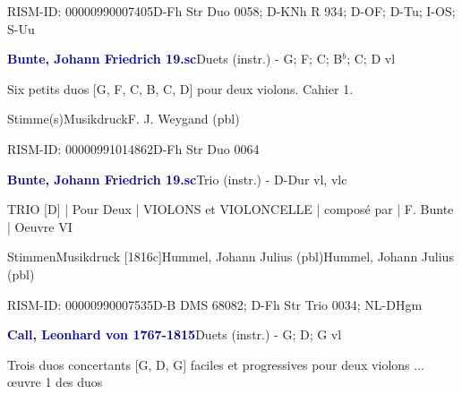 \documentclass[twocolumn]{book}
\begin{document}
\par RISM-ID: 00000990007405\newline D-Fh  Str Duo 0058; D-KNh  R 934; D-OF; D-Tu; I-OS; S-Uu
\par \vspace{7pt} \textcolor{darkblue}{\textbf{Bunte, Johann Friedrich  19.sc}}\hfillplus{\textbf{[252]}}\newline Duets (instr.) - G; F; C; B$^b$; C; D vl
\par \begin{itshape}Six petits duos [G, F, C, B, C, D] pour deux violons. Cahier 1.\end{itshape} 
\par \textcolor{darkblue}{}  Stimme(s)\newline Musikdruck\newline F. J. Weygand  (pbl)
\par RISM-ID: 00000991014862\newline D-Fh  Str Duo 0064
\par \vspace{7pt} \textcolor{darkblue}{\textbf{Bunte, Johann Friedrich  19.sc}}\hfillplus{\textbf{[253]}}\newline Trio (instr.) - D-Dur vl, vlc
\par \begin{itshape}TRIO [D] | Pour Deux | VIOLONS et VIOLONCELLE | composé par | F. Bunte | Oeuvre VI\end{itshape} 
\par \textcolor{darkblue}{}  Stimmen\newline Musikdruck  [1816c]\newline Hummel, Johann Julius  (pbl)\newline Hummel, Johann Julius  (pbl)
\par RISM-ID: 00000990007535\newline D-B  DMS 68082; D-Fh  Str Trio 0034; NL-DHgm
\par \vspace{7pt} \textcolor{darkblue}{\textbf{Call, Leonhard von  1767-1815}}\hfillplus{\textbf{[254]}}\newline Duets (instr.) - G; D; G vl
\par \begin{itshape}Trois duos concertants [G, D, G] faciles et progressives pour deux violons ... œuvre 1 des duos\end{itshape} 
\end{document}
